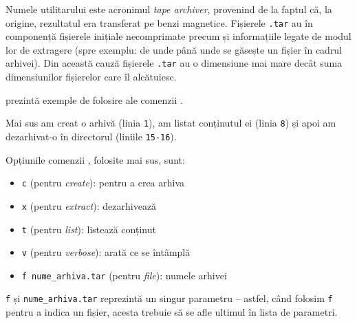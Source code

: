 Numele utilitarului  este acronimul \textit{tape archiver}, provenind de la faptul că, la origine, rezultatul era transferat pe benzi magnetice.
Fișierele \texttt{.tar} au în componență fișierele inițiale necomprimate precum și informațiile legate de modul lor de extragere (spre exemplu: de unde până unde se găsește un fișier în cadrul arhivei).
Din această cauză fișierele \texttt{.tar} au o dimensiune mai mare decât suma dimensiunilor fișierelor care îl alcătuiesc.

 prezintă exemple de folosire ale comenzii .


Mai sus am creat o arhivă  (linia \texttt{1}), am listat conținutul ei (linia \texttt{8}) și apoi am dezarhivat-o în directorul  (liniile \texttt{15-16}).

Opțiunile comenzii , folosite mai sus, sunt:
\begin{itemize}
  \item \texttt{c} (pentru \textit{create}): pentru a crea arhiva
  \item \texttt{x} (pentru \textit{extract}): dezarhivează
  \item \texttt{t} (pentru \textit{list}): listează conținut
  \item \texttt{v} (pentru \textit{verbose}): arată ce se întâmplă
  \item \texttt{f nume\_arhiva.tar} (pentru \textit{file}): numele arhivei
\end{itemize}

\begin{note}[Observație]
\texttt{f} și \texttt{nume\_arhiva.tar} reprezintă un singur parametru – astfel, când folosim \texttt{f} pentru a indica un fișier, acesta trebuie să se afle ultimul în lista de parametri.
\end{note}

